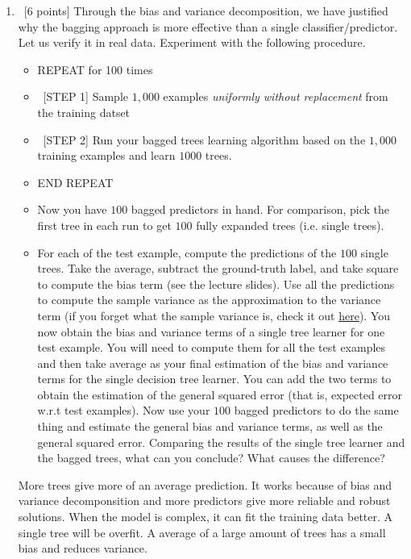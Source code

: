 \documentclass[12pt, fullpage,letterpaper]{article}
\begin{document}
\begin{enumerate}
\begin{enumerate}
	\item~[6 points] Through the bias and variance decomposition, we have justified why the bagging approach is more effective than a single classifier/predictor. Let us verify it in real data. Experiment with the following procedure.
	\begin{itemize}
		\item REPEAT for 100 times
		\item ~[STEP 1] Sample $1,000$ examples \textit{uniformly without replacement} from the training datset
		\item ~[STEP 2] Run your bagged trees learning algorithm based on the $1,000$ training examples and learn $1000$ trees.
		\item END REPEAT 
		\item Now you have $100$ bagged predictors in hand. For comparison, pick the first tree in each run to get $100$ fully expanded trees (i.e. single trees). 
		\item 	For each of the test example, compute the predictions of the $100$ single trees. Take the average, subtract the ground-truth label, and take square to compute the bias term (see the lecture slides). Use all the predictions to compute the sample variance  as the approximation to the variance term (if you forget what the sample variance is, check it out 
		\href{http://www.randomservices.org/random/sample/Variance.html}{here}). You now obtain the bias and variance terms of a single tree learner for one test example. You will need to compute them for all the test examples and then take average as your final estimation of the bias and variance terms for the single decision tree learner. You can add the two terms to obtain the estimation of the general squared error (that is, expected error w.r.t test examples). Now use your $100$ bagged predictors to do the same thing and estimate the general bias and variance terms, as well as the general squared error.  Comparing the results of the single tree learner and the bagged trees, what can you conclude?  What causes the difference?  \newline
	\end{itemize}
	 
More trees give more of an average prediction. It works because of bias and variance decomponsition and more predictors give more reliable and robust solutions. When the model is complex, it can fit the training data better. A single tree will be overfit. A average of a large amount of trees has a small bias and reduces variance. 



\end{enumerate}
\end{enumerate}
\end{document}
